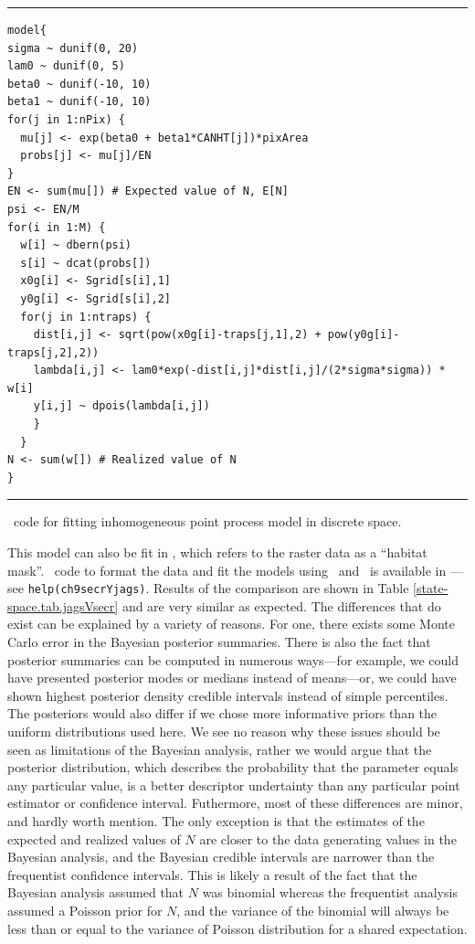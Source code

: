 \begin{panel}%
\centering
\rule[0.15in]{\textwidth}{.03in}
\begin{small}
\begin{verbatim}
model{
sigma ~ dunif(0, 20)
lam0 ~ dunif(0, 5)
beta0 ~ dunif(-10, 10)
beta1 ~ dunif(-10, 10)
for(j in 1:nPix) {
  mu[j] <- exp(beta0 + beta1*CANHT[j])*pixArea
  probs[j] <- mu[j]/EN
}
EN <- sum(mu[]) # Expected value of N, E[N]
psi <- EN/M
for(i in 1:M) {
  w[i] ~ dbern(psi)
  s[i] ~ dcat(probs[])
  x0g[i] <- Sgrid[s[i],1]
  y0g[i] <- Sgrid[s[i],2]
  for(j in 1:ntraps) {
    dist[i,j] <- sqrt(pow(x0g[i]-traps[j,1],2) + pow(y0g[i]-traps[j,2],2))
    lambda[i,j] <- lam0*exp(-dist[i,j]*dist[i,j]/(2*sigma*sigma)) * w[i]
    y[i,j] ~ dpois(lambda[i,j])
    }
  }
N <- sum(w[]) # Realized value of N
}
\end{verbatim}
\end{small}
\rule[0.15in]{\textwidth}{.03in}
\caption{\bugs~code for fitting inhomogeneous point process model in
  discrete space.}
\label{state-space.panel1}
\end{panel}

This model can also be fit in \secr, which refers
to the raster data as a ``habitat mask''. \R~code to format the data
and fit the models using \secr~and \jags~is available in \scrbook---see
\verb#help(ch9secrYjags)#. Results of the
comparison are shown in Table \ref{state-space.tab.jagsVsecr} and are
very similar as expected. The differences that do exist can be
explained by a variety of reasons. For one, there exists some Monte
Carlo error in the Bayesian posterior summaries. There is also the
fact that posterior summaries can be computed in numerous ways---for
example, we could have presented posterior modes or medians instead of
means---or, we could have shown highest posterior density credible
intervals instead of simple percentiles. The posteriors would also
differ if we chose more informative priors than the uniform
distributions used here. We see no reason why these
issues should be seen as limitations of the Bayesian analysis, rather
we would argue that the posterior distribution, which describes the
probability that the parameter equals any particular value, is a
better descriptor undertainty than any particular point estimator or
confidence interval. Futhermore, most of these differences are minor,
and hardly worth mention. The only exception is that the estimates of
the expected and realized values of $N$ are closer to the data
generating values in the Bayesian analysis, and the Bayesian credible
intervals are narrower than the frequentist confidence intervals. This
is likely a result of the fact that the Bayesian analysis assumed
that $N$ was binomial whereas the frequentist analysis
assumed a Poisson prior for $N$, and the variance of the binomial will
always be less than or equal to the variance of Poisson distribution
for a shared expectation.

